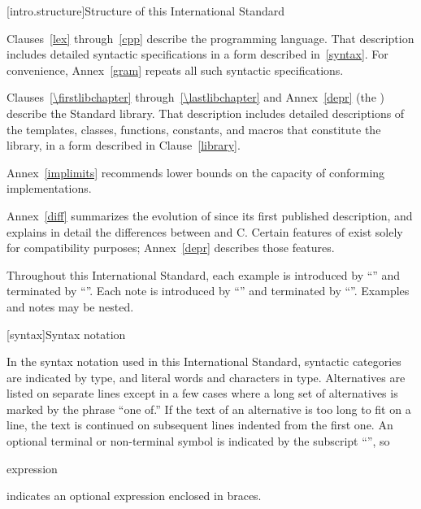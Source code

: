 [intro.structure]{Structure of this International Standard}

\pnum
{}%
%
Clauses~\ref{lex} through~\ref{cpp} describe the \Cpp  programming
language. That description includes detailed syntactic specifications in
a form described in~\ref{syntax}. For convenience, Annex~\ref{gram}
repeats all such syntactic specifications.

\pnum
Clauses~\ref{\firstlibchapter} through~\ref{\lastlibchapter} and Annex~\ref{depr}
(the ) describe the Standard \Cpp  library.
That description includes detailed descriptions of the templates, classes, functions, constants, and macros that constitute the library, in a form described in Clause~\ref{library}.


\pnum
Annex~\ref{implimits} recommends lower bounds on the capacity of conforming
implementations.

\pnum
Annex~\ref{diff} summarizes the evolution of \Cpp  since its first
published description, and explains in detail the differences between
\Cpp  and C\@. Certain features of \Cpp  exist solely for compatibility
purposes; Annex~\ref{depr} describes those features.

\pnum
Throughout this International Standard, each example is introduced by
``\enterexample'' and terminated by ``\exitexample''. Each note is
introduced by ``\enternote'' and terminated by ``\exitnote''. Examples
and notes may be nested.%

[syntax]{Syntax notation}

\pnum
{}%
In the syntax notation used in this International Standard, syntactic
categories are indicated by  type, and literal words
and characters in   type. Alternatives are
listed on separate lines except in a few cases where a long set of
alternatives is marked by the phrase ``one of.'' If the text of an alternative is too long to fit on a line, the text is continued on subsequent lines indented from the first one.
An optional terminal or non-terminal symbol is indicated by the subscript
``\opt'', so

\begin{ncbnf}
\terminal{\{} expression\opt \terminal{\}}
\end{ncbnf}

indicates an optional expression enclosed in braces.%

